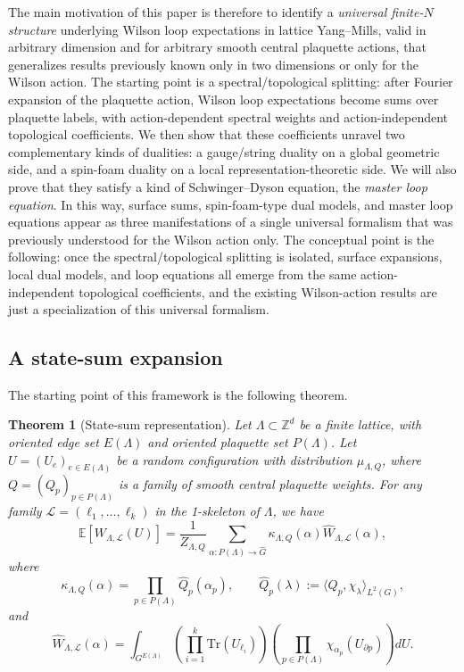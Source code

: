 \documentclass[11pt,a4paper,reqno]{article}
\newtheorem{theorem}{Theorem}[section]
\theoremstyle{definition}
\theoremstyle{remark}
\newcommand\Z{{\mathbb Z}}
\newcommand\Tr{\mathrm{Tr}}
\newcommand\E{\mathbb{E}}
\newcommand\Lc{{\mathcal{L}}}
\begin{document}
The main motivation of this paper is therefore to identify a \emph{universal finite-$N$ structure} underlying Wilson loop expectations in lattice Yang--Mills, valid in arbitrary dimension and for arbitrary smooth central plaquette actions, that generalizes results previously known only in two dimensions or only for the Wilson action. The starting point is a spectral/topological splitting: after Fourier expansion of the plaquette action, Wilson loop expectations become sums over plaquette labels, with action-dependent spectral weights and action-independent topological coefficients. We then show that these coefficients unravel two complementary kinds of dualities: a gauge/string duality on a global geometric side, and a spin-foam duality on a local representation-theoretic side. We will also prove that they satisfy a kind of Schwinger--Dyson equation, the \emph{master loop equation}. In this way, surface sums, spin-foam-type dual models, and master loop equations appear as three manifestations of a single universal formalism that was previously understood for the Wilson action only. The conceptual point is the following: once the spectral/topological splitting is isolated, surface expansions, local dual models, and loop equations all emerge from the same action-independent topological coefficients, and the existing Wilson-action results are just a specialization of this universal formalism.

\subsection{A state-sum expansion}

The starting point of this framework is the following theorem.

\begin{theorem}[State-sum representation]\label{thm:state_sum_Wilson}
Let $\Lambda\subset\Z^d$ be a finite lattice, with oriented edge set $E(\Lambda)$ and oriented plaquette set $P(\Lambda)$. Let $U=(U_e)_{e\in E(\Lambda)}$ be a random configuration with distribution $\mu_{\Lambda,Q}$, where $Q=(Q_p)_{p\in P(\Lambda)}$ is a family of smooth central plaquette weights. For any family $\Lc=(\ell_1,\ldots,\ell_k)$ in the 1-skeleton of $\Lambda$, we have
\begin{equation}\label{eq:State_sum_Wilson}
\E\left[W_{\Lambda,\Lc}(U)\right]=\frac{1}{Z_{\Lambda,Q}}\sum_{\alpha:P(\Lambda)\to\widehat{G}}\kappa_{\Lambda,Q}(\alpha)\widehat{W}_{\Lambda,\Lc}(\alpha),
\end{equation}
where
\begin{equation}\label{eq:top_coef}
\kappa_{\Lambda,Q}(\alpha)=\prod_{p\in P(\Lambda)}\widehat Q_p(\alpha_p),\qquad
\widehat Q_p(\lambda):=\langle Q_p,\chi_\lambda\rangle_{L^2(G)},
\end{equation}
and
\begin{equation}\label{eq:topological-coefficient}
\widehat{W}_{\Lambda,\Lc}(\alpha)=\int_{G^{E(\Lambda)}} \left(\prod_{i=1}^k\Tr(U_{\ell_i})\right)\left(\prod_{p\in P(\Lambda)}\chi_{\alpha_p}(U_{\partial p})\right)dU.
\end{equation}
\end{theorem}
\end{document}
